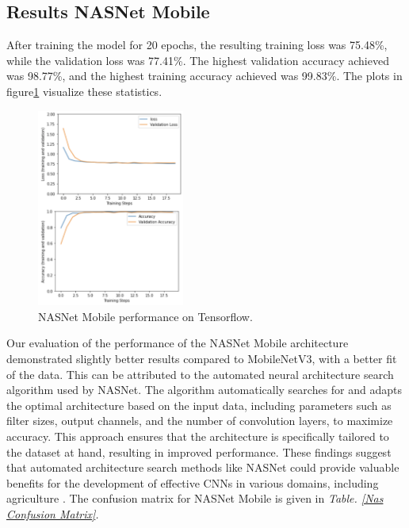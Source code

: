 \documentclass[conference]{IEEEtran}
\begin{document}
\subsection{Results NASNet Mobile}
After training the model for 20 epochs, the resulting training loss was 75.48\%, while the validation loss was 77.41\%. The highest validation accuracy achieved was 98.77\%, and the highest training accuracy achieved was 99.83\%. The plots in figure\ref{Nas Performance} visualize these statistics. 

\begin{figure}[h]
\centerline{\includegraphics[height=6.5cm, width = 1\linewidth]{Images/Screen Shot 2021-05-10 at 4.36.35 PM.pdf}}
\caption{NASNet Mobile performance on Tensorflow. }
\label{Nas Performance}
\end{figure}

Our evaluation of the performance of the NASNet Mobile architecture demonstrated slightly better results compared to MobileNetV3, with a better fit of the data. This can be attributed to the automated neural architecture search algorithm used by NASNet. The algorithm automatically searches for and adapts the optimal architecture based on the input data, including parameters such as filter sizes, output channels, and the number of convolution layers, to maximize accuracy. This approach ensures that the architecture is specifically tailored to the dataset at hand, resulting in improved performance. These findings suggest that automated architecture search methods like NASNet could provide valuable benefits for the development of effective CNNs in various domains, including agriculture \cite{Yanhui}. The confusion matrix for NASNet Mobile is given in \emph{Table. \ref{Nas Confusion Matrix}.}
\end{document}
